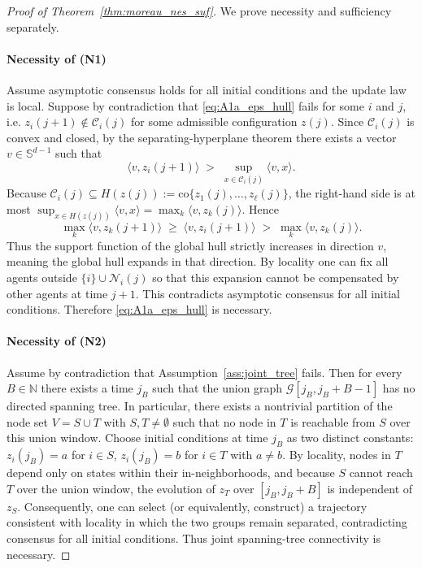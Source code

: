 \documentclass[12pt,draftcls,onecolumn]{IEEEtran}
\def\Cij{\mathcal{C}_i (j)}
\def\co{\mathrm{co}}
\begin{document}
\begin{proof}[Proof of Theorem~\ref{thm:moreau_nes_suf}]
We prove necessity and sufficiency separately.

\paragraph{Necessity of (N1)}
Assume asymptotic consensus holds for all initial conditions and the update law is local.
Suppose by contradiction that \eqref{eq:A1a_eps_hull} fails for some $i$ and $j$, i.e.
$z_i(j+1)\notin \Cij$ for some admissible configuration $z(j)$.
Since $\Cij$ is convex and closed, by the separating-hyperplane theorem there exists a vector
$v\in\mathbb S^{d-1}$ such that
\[
\langle v, z_i(j+1)\rangle \;>\; \sup_{x\in \Cij} \langle v,x\rangle.
\]
Because $\Cij\subseteq H(z(j)):=\co\{z_1(j),\dots,z_\ell(j)\}$, the right-hand side is at most
$\sup_{x\in H(z(j))}\langle v,x\rangle = \max_k \langle v,z_k(j)\rangle$. Hence
\[
\max_k \langle v,z_k(j+1)\rangle \;\ge\; \langle v,z_i(j+1)\rangle
\;>\; \max_k \langle v,z_k(j)\rangle.
\]
Thus the support function of the global hull strictly increases in direction $v$, meaning the global hull
expands in that direction. By locality one can fix all agents outside $\{i\}\cup\mathcal N_i(j)$ so that this
expansion cannot be compensated by other agents at time $j+1$. This contradicts asymptotic consensus for all
initial conditions. Therefore \eqref{eq:A1a_eps_hull} is necessary.

\paragraph{Necessity of (N2)}
Assume by contradiction that Assumption~\ref{ass:joint_tree} fails. Then for every $B\in\mathbb N$ there exists
a time $j_B$ such that the union graph $\mathcal G[j_B,j_B+B-1]$ has no directed spanning tree. In particular,
there exists a nontrivial partition of the node set $V=S\cup T$ with $S,T\neq\emptyset$ such that no node in $T$
is reachable from $S$ over this union window. Choose initial conditions at time $j_B$ as two distinct constants:
$z_i(j_B)=a$ for $i\in S$, $z_i(j_B)=b$ for $i\in T$ with $a\neq b$. By locality, nodes in $T$ depend only on
states within their in-neighborhoods, and because $S$ cannot reach $T$ over the union window, the evolution of
$z_T$ over $[j_B,j_B+B]$ is independent of $z_S$. Consequently, one can select (or equivalently, construct) a
trajectory consistent with locality in which the two groups remain separated, contradicting consensus for all
initial conditions. Thus joint spanning-tree connectivity is necessary.


\end{proof}
\end{document}
